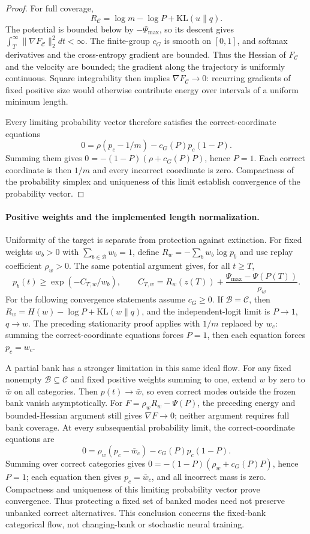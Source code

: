 \documentclass{article}
\newcommand{\1}{\mathbf 1}
\theoremstyle{remark}
\theoremstyle{definition}
\theoremstyle{plain}
\begin{document}
\begin{proof}
For full coverage,
\begin{equation}
 R_{\mathcal C}=\log m-\log P+\mathrm{KL}(u\|q).
 \label{eq:replay-mass-uniformity-decomposition}
\end{equation}
The potential is bounded below by $-\Psi_{\max}$, so its descent gives
$\int_T^\infty\|\nabla F_{\mathcal C}\|_2^2dt<\infty$. The finite-group
$c_G$ is smooth on $[0,1]$, and softmax derivatives and the cross-entropy
gradient are bounded. Thus the Hessian of $F_{\mathcal C}$ and the velocity
are bounded; the gradient along the trajectory is uniformly continuous.
Square integrability then implies $\nabla F_{\mathcal C}\to0$: recurring
gradients of fixed positive size would otherwise contribute energy over
intervals of a uniform minimum length.

Every limiting probability vector therefore satisfies the correct-coordinate
equations
\[
 0=\rho(p_c-1/m)-c_G(P)p_c(1-P).
\]
Summing them gives $0=-(1-P)(\rho+c_G(P)P)$, hence $P=1$. Each correct
coordinate is then $1/m$ and every incorrect coordinate is zero. Compactness
of the probability simplex and uniqueness of this limit establish convergence
of the probability vector.
\end{proof}

\paragraph{Positive weights and the implemented length normalization.}
Uniformity of the target is separate from protection against extinction.
For fixed weights $w_b>0$ with $\sum_{b\in\mathcal B}w_b=1$, define
$R_w=-\sum_b w_b\log p_b$ and use replay coefficient $\rho_w>0$.
The same potential argument gives, for all $t\ge T$,
\[
 p_b(t)\ge\exp(-C_{T,w}/w_b),\qquad
 C_{T,w}=R_w(z(T))+\frac{\Psi_{\max}-\Psi(P(T))}{\rho_w}.
\]
For the following convergence statements assume $c_G\ge0$.
If $\mathcal B=\mathcal C$, then
$R_w=H(w)-\log P+\mathrm{KL}(w\|q)$, and the independent-logit limit is
$P\to1$, $q\to w$. The preceding stationarity proof applies with $1/m$
replaced by $w_c$: summing the correct-coordinate equations forces $P=1$,
then each equation forces $p_c=w_c$.

A partial bank has a stronger limitation in this same ideal flow. For any
fixed nonempty $\mathcal B\subseteq\mathcal C$ and fixed positive weights
summing to one, extend $w$ by zero to $\bar w$ on all categories. Then
$p(t)\to\bar w$, so even correct modes outside the frozen bank vanish
asymptotically. For $F=\rho_wR_w-\Psi(P)$, the preceding energy and
bounded-Hessian argument still gives $\nabla F\to0$; neither argument
requires full bank coverage.
At every subsequential probability limit, the correct-coordinate equations are
\[
 0=\rho_w(p_c-\bar w_c)-c_G(P)p_c(1-P).
\]
Summing over correct categories gives
$0=-(1-P)(\rho_w+c_G(P)P)$, hence $P=1$; each equation then gives
$p_c=\bar w_c$, and all incorrect mass is zero. Compactness and uniqueness
of this limiting probability vector prove convergence. Thus protecting a
fixed set of banked modes need not preserve unbanked correct alternatives.
This conclusion concerns the fixed-bank categorical flow, not changing-bank
or stochastic neural training.
\end{document}
